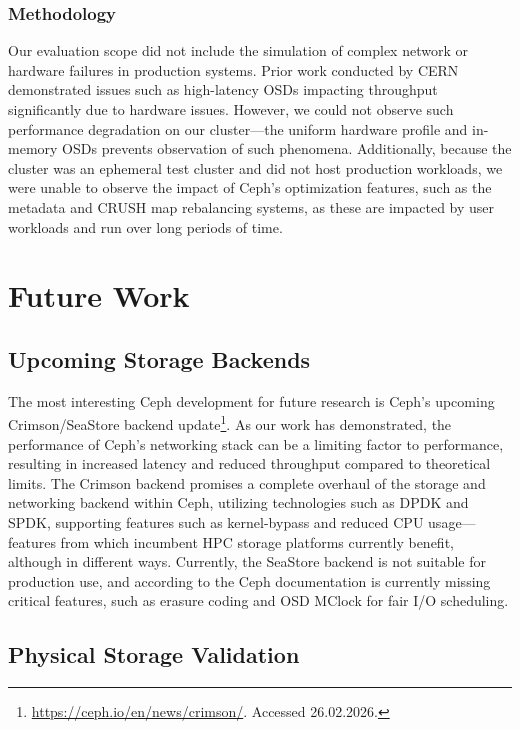 \subsubsection{Methodology}

Our evaluation scope did not include the simulation of complex network or hardware failures in production systems. Prior work conducted by CERN~\cite{cern-evaluating-cephfs-perf} demonstrated issues such as high-latency \acp{OSD} impacting throughput significantly due to hardware issues. However, we could not observe such performance degradation on our cluster---the uniform hardware profile and in-memory \acp{OSD} prevents observation of such phenomena. Additionally, because the cluster was an ephemeral test cluster and did not host production workloads, we were unable to observe the impact of Ceph's optimization features, such as the metadata and \ac{CRUSH} map rebalancing systems, as these are impacted by user workloads and run over long periods of time.

\pagebreak
\section{Future Work}
\label{sec:future-work}

\subsection{Upcoming Storage Backends}

The most interesting Ceph development for future research is Ceph's upcoming Crimson/SeaStore backend update\footnote{\url{https://ceph.io/en/news/crimson/}. Accessed 26.02.2026.}. As our work has demonstrated, the performance of Ceph's networking stack can be a limiting factor to performance, resulting in increased latency and reduced throughput compared to theoretical limits. The Crimson backend promises a complete overhaul of the storage and networking backend within Ceph, utilizing technologies such as \ac{DPDK} and \ac{SPDK}, supporting features such as kernel-bypass and reduced \ac{CPU} usage---features from which incumbent \ac{HPC} storage platforms currently benefit, although in different ways. Currently, the SeaStore backend is not suitable for production use, and according to the Ceph documentation is currently missing critical features, such as erasure coding and \ac{OSD} MClock for fair \ac{I/O} scheduling.

\subsection{Physical Storage Validation}

